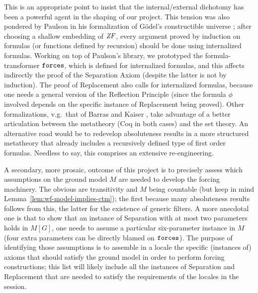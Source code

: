 This is an appropriate point to insist that the internal/external
dichotomy has been a powerful agent in the shaping of our project.
This tension was also pondered by Paulson in his formalization of
G\"odel's constructible universe \cite{paulson_2003}; after choosing a
shallow embedding of $\mathit{ZF}$, every argument proved by induction on
formulas (or functions defined by recursion) should be done using
internalized formulas. Working on top of Paulson's library, we
prototyped the formula-transformer $\mathop{\mathtt{forces}}$, which is defined for
internalized formulas, and this affects indirectly the proof of the
Separation Axiom (despite the latter is not by induction). The proof
of Replacement also calls for internalized formulas, because one needs
a general version of the Reflection Principle (since the formula
$\phi$ involved depends on the specific instance of Replacement being
proved). Other formalizations, v.g.\ that of Barras
\cite{barras-habilit} and Kaiser \cite{kaiser-set-theory-coq}, take
advantage of a better articulation between the metatheory (Coq in both
cases) and the set theory. An alternative road would be to redevelop
absoluteness 
results in a more structured metatheory that already includes a
recursively defined type of first order formulas. Needless to say, this
comprises an extensive re-engineering.   

A secondary, more prosaic, outcome of this project is to precisely
assess which assumptions on the ground model $M$ are needed to develop
the forcing machinery. The obvious are transitivity and $M$ being
countable (but keep in mind Lemma~\ref{lem:wf-model-implies-ctm}); the
first because many absoluteness results follows from this, the latter
for the existence of generic filters. A
more anecdotal one is that to show that an instance of Separation
with at most two parameters holds in $M[G]$, one needs to assume a
particular  six-parameter
instance in $M$ (four extra parameters can be directly blamed on
$\mathop{\mathtt{forces}}$).  The purpose of identifying those assumptions is to assemble
in a locale the specific (instances of) axioms that should satisfy the
ground model in order to perform forcing constructions; this list will
likely include all the instances of Separation and Replacement that
are needed to satisfy the requirements of the locales in the
 session.

